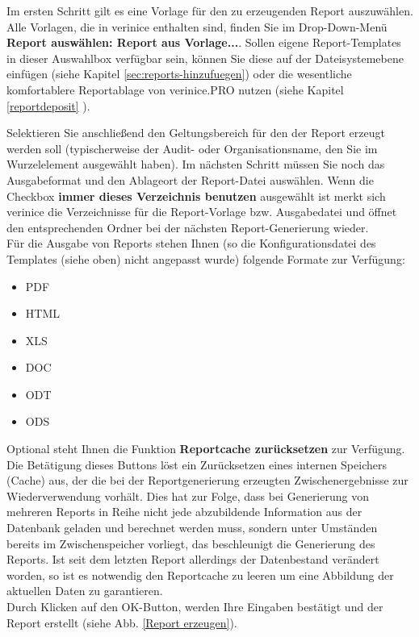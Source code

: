\documentclass[a4paper,10pt]{book}
\begin{document}
Im ersten Schritt gilt es eine Vorlage für den zu erzeugenden Report
auszuwählen. Alle Vorlagen, die in verinice enthalten sind, finden Sie
im Drop-Down-Menü \textbf{Report auswählen: Report aus Vorlage...}.
Sollen eigene Report-Templates in dieser Auswahlbox verfügbar sein,
können Sie diese auf der Dateisystemebene einfügen (siehe Kapitel \ref{sec:reports-hinzufuegen})
oder die wesentliche komfortablere Reportablage von verinice.PRO nutzen (siehe Kapitel \ref{reportdeposit} ).

Selektieren Sie anschließend den Geltungsbereich für den der Report erzeugt werden soll
(typischerweise der Audit- oder Organisationsname, den Sie im Wurzelelement ausgewählt haben). Im nächsten Schritt müssen Sie noch das Ausgabeformat
und den Ablageort der Report-Datei auswählen. Wenn die Checkbox \textbf{immer dieses Verzeichnis benutzen} ausgewählt ist merkt sich verinice die Verzeichnisse für die Report-Vorlage bzw. Ausgabedatei und öffnet den entsprechenden Ordner bei der nächsten Report-Generierung wieder.
\newline\\
Für die Ausgabe von Reports stehen Ihnen (so die Konfigurationsdatei des Templates (siehe oben) nicht angepasst wurde) folgende Formate zur Verfügung:
\begin{itemize}
 \item \textsc{PDF}
 \item \textsc{HTML}
 \item \textsc{XLS}
 \item \textsc{DOC}
 \item \textsc{ODT}
 \item \textsc{ODS}
\end{itemize}
Optional steht Ihnen die Funktion \textbf{Reportcache zurücksetzen} zur
Verfügung. Die Betätigung dieses Buttons löst ein Zurücksetzen eines
internen Speichers (Cache) aus,
der die bei der Reportgenerierung erzeugten Zwischenergebnisse zur
Wiederverwendung vorhält. Dies hat zur Folge, dass bei Generierung von
mehreren Reports in Reihe nicht jede abzubildende Information aus der Datenbank geladen und berechnet werden muss, sondern unter Umständen bereits im
Zwischenspeicher vorliegt, das beschleunigt die Generierung des Reports. Ist seit
dem letzten Report allerdings der Datenbestand verändert worden, so ist
es notwendig den Reportcache zu leeren um eine Abbildung der aktuellen
Daten zu garantieren.
\newline\\
Durch Klicken auf den OK-Button, werden Ihre Eingaben bestätigt und der Report erstellt (siehe Abb. \ref{Report erzeugen}).
\end{document}
